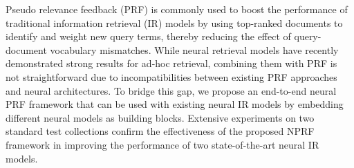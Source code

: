 Pseudo relevance feedback (PRF) is commonly used to boost the performance of traditional information retrieval (IR) models by using top-ranked documents to identify and weight new query terms, thereby reducing the effect of query-document vocabulary mismatches. While neural retrieval models have recently demonstrated strong results for ad-hoc retrieval, combining them with PRF is not straightforward due to incompatibilities between existing PRF approaches and neural architectures. To bridge this gap, we propose an end-to-end neural PRF framework that can be used with existing neural IR models by embedding different neural models as building blocks. Extensive experiments on two standard test collections confirm the effectiveness of the proposed NPRF framework in improving the performance of two state-of-the-art neural IR models.
